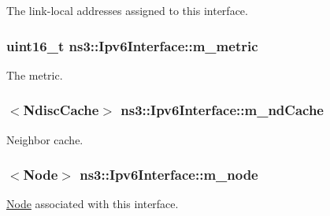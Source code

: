 The link-\/local addresses assigned to this interface. 

\subsubsection[{\texorpdfstring{m\+\_\+metric}{m_metric}}]{\setlength{\rightskip}{0pt plus 5cm}uint16\+\_\+t ns3\+::\+Ipv6\+Interface\+::m\+\_\+metric\hspace{0.3cm}{\ttfamily [private]}}\hypertarget{classns3_1_1Ipv6Interface_a6a1ef3af8fb5f291c8f4bce8d8f19197}{}\label{classns3_1_1Ipv6Interface_a6a1ef3af8fb5f291c8f4bce8d8f19197}


The metric. 

\subsubsection[{\texorpdfstring{m\+\_\+nd\+Cache}{m_ndCache}}]{$<${\bf Ndisc\+Cache}$>$ ns3\+::\+Ipv6\+Interface\+::m\+\_\+nd\+Cache\hspace{0.3cm}{\ttfamily [private]}}\hypertarget{classns3_1_1Ipv6Interface_a1bdc18fe1112305b92a32ed8d741624b}{}\label{classns3_1_1Ipv6Interface_a1bdc18fe1112305b92a32ed8d741624b}


Neighbor cache. 

\subsubsection[{\texorpdfstring{m\+\_\+node}{m_node}}]{$<${\bf Node}$>$ ns3\+::\+Ipv6\+Interface\+::m\+\_\+node\hspace{0.3cm}{\ttfamily [private]}}\hypertarget{classns3_1_1Ipv6Interface_abc501f6da776acb53e65d8e657813d60}{}\label{classns3_1_1Ipv6Interface_abc501f6da776acb53e65d8e657813d60}


\hyperlink{classns3_1_1Node}{Node} associated with this interface. 

